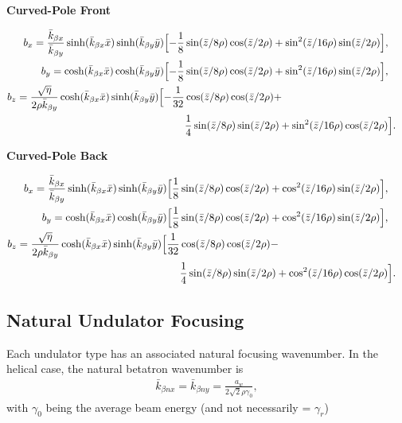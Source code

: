 \documentclass[12pt]{article}%
\begin{document}
{\bf Curved-Pole Front}


\begin{align}
b_x  =  \frac{\bar{k}_{\beta x}}{\bar{k}_{\beta y}} \sinh(\bar{k}_{\beta x} \bar{x})\sinh(\bar{k}_{\beta y} \bar{y}) \Bigl[ -\frac{1}{8}& \sin(\bar{z}/8\rho) \cos(\bar{z} / 2\rho) +   \sin^2(\bar{z}/16\rho) \sin(\bar{z} / 2\rho)   \Bigr],    &    \\
b_y   =  \cosh(\bar{k}_{\beta x} \bar{x})\cosh(\bar{k}_{\beta y} \bar{y}) \Bigl[ -\frac{1}{8}& \sin(\bar{z}/8\rho) \cos(\bar{z} / 2\rho) +   \sin^2(\bar{z}/16\rho) \sin(\bar{z} / 2\rho)   \Bigr], \\
b_z  =  \frac{\sqrt{\eta}}{2 \rho \bar{k}_{\beta y}}  \cosh(\bar{k}_{\beta x} \bar{x})\sinh(\bar{k}_{\beta y} \bar{y})  \Bigl[ -\frac{1}{32} & \cos(\bar{z}/8\rho) \cos(\bar{z}/2\rho) + \nonumber \\ 
                                                &\frac{1}{4}  \sin(\bar{z}/8\rho)\sin(\bar{z}/2\rho) + \sin^2  (\bar{z}/16\rho) \cos(\bar{z}/2\rho)  \Bigr] .
\end{align}

{\bf Curved-Pole Back}

\begin{align}
b_x  =  \frac{\bar{k}_{\beta x}}{\bar{k}_{\beta y}} \sinh(\bar{k}_{\beta x} \bar{x})\sinh(\bar{k}_{\beta y} \bar{y}) \Bigl[ \frac{1}{8}& \sin(\bar{z}/8\rho) \cos(\bar{z} / 2\rho) +   \cos^2(\bar{z}/16\rho) \sin(\bar{z} / 2\rho)   \Bigr],    &    \\
b_y   =  \cosh(\bar{k}_{\beta x} \bar{x})\cosh(\bar{k}_{\beta y} \bar{y}) \Bigl[ \frac{1}{8}& \sin(\bar{z}/8\rho) \cos(\bar{z} / 2\rho) +   \cos^2(\bar{z}/16\rho) \sin(\bar{z} / 2\rho)   \Bigr], \\
b_z  =  \frac{\sqrt{\eta}}{2 \rho \bar{k}_{\beta y}}  \cosh(\bar{k}_{\beta x} \bar{x})\sinh(\bar{k}_{\beta y} \bar{y})  \Bigl[ \frac{1}{32} & \cos(\bar{z}/8\rho) \cos(\bar{z}/2\rho) - \nonumber \\ 
                                                &\frac{1}{4}  \sin(\bar{z}/8\rho)\sin(\bar{z}/2\rho) + \cos^2  (\bar{z}/16\rho) \cos(\bar{z}/2\rho)  \Bigr] .
\end{align}



\subsection{Natural Undulator Focusing}

Each undulator type has an associated natural focusing wavenumber. In the helical case, the natural betatron wavenumber is
\begin{align}
\bar{k}_{\beta n x} = \bar{k}_{\beta n y} = \frac{a_w}{2 \sqrt{2} \rho \gamma_0},
\end{align}
with $\gamma_0$ being the average beam energy (and not necessarily = $\gamma_r$)
\end{document}
